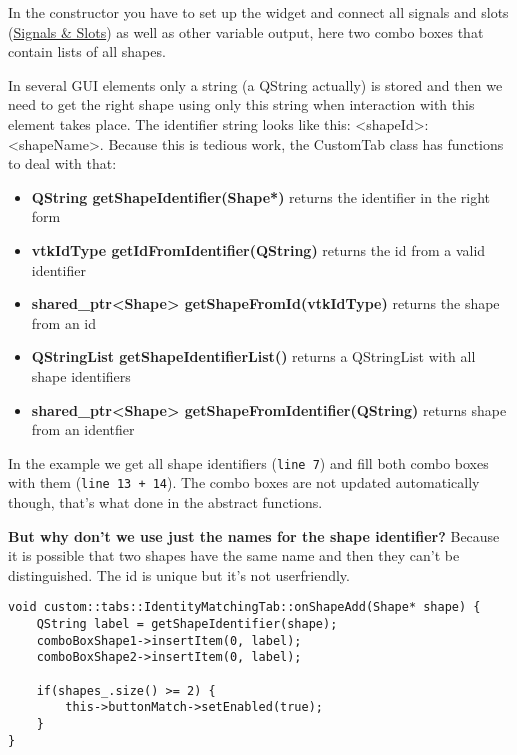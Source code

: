 In the constructor you have to set up the widget and connect all signals and slots (\href{http://qt-project.org/doc/qt-4.8/signalsandslots.html}{Signals \& Slots}) as well as other variable output, here two combo boxes that contain lists of all shapes. 

In several GUI elements only a string (a QString actually) is stored and then we need to get the right shape using only this string when interaction with this element takes place. The identifier string looks like this: <shapeId>:<shapeName>. Because this is tedious work, the CustomTab class has functions to deal with that: 

\begin{itemize}
	\item \textbf{QString getShapeIdentifier(Shape*)} returns the identifier in the right form
	\item \textbf{vtkIdType getIdFromIdentifier(QString)} returns the id from a valid identifier
	\item \textbf{shared\_ptr<Shape> getShapeFromId(vtkIdType)} returns the shape from an id
	\item \textbf{QStringList getShapeIdentifierList()} returns a QStringList with all shape identifiers
	\item \textbf{shared\_ptr<Shape> getShapeFromIdentifier(QString)} returns shape from an identfier
\end{itemize}

In the example we get all shape identifiers (\texttt{line 7}) and fill both combo boxes with them (\texttt{line 13 + 14}). The combo boxes are not updated automatically though, that's what done in the abstract functions. 

\begin{mdframed}
\textbf{But why don't we use just the names for the shape identifier?} Because it is possible that two shapes have the same name and then they can't be distinguished. The id is unique but it's not userfriendly.
\end{mdframed}

\begin{lstlisting}[style=lstStyleCpp, caption={IdentityMatchingTab.cpp, onShapeAdd}]
void custom::tabs::IdentityMatchingTab::onShapeAdd(Shape* shape) {
    QString label = getShapeIdentifier(shape);
    comboBoxShape1->insertItem(0, label);
    comboBoxShape2->insertItem(0, label);
    
    if(shapes_.size() >= 2) {
        this->buttonMatch->setEnabled(true);
    }
}
\end{lstlisting}


